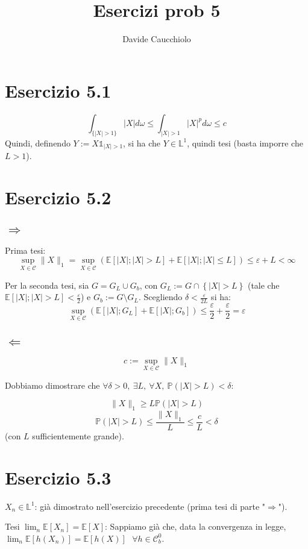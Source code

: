 \documentclass{article}
\title{Esercizi prob 5}
\author{Davide Caucchiolo}
\begin{document}
\section{Esercizio 5.1}
\[\int_{\{|X|>1\}}\left|X\right| d\omega \leq \int_{|X|>1} \left|X\right|^p d\omega \leq c\]
Quindi, definendo $Y:=X \mathds{1}_{|X|>1}$, si ha che $Y\in \mathbb{L}^1$, quindi tesi (basta imporre che $L>1$).

\section{Esercizio 5.2}
\subsection{$\Rightarrow $}
Prima tesi:
\[
	\sup_{X\in \mathcal{C}} \|X\|_1 
	= \sup_{X\in \mathcal{C}} \left(\mathbb{E}\left[\left|X\right|; \left|X\right| > L\right] + \mathbb{E}\left[\left|X\right|; \left|X\right| \leq  L\right]\right) 
	\leq  \varepsilon +L < \infty     
\]    

Per la seconda tesi, sia $G = G_L \cup G_b$, con $G_L:= G\cap \left\{|X|>L\right\}$ (tale che $\mathbb{E}\left[\left|X\right|; \left|X\right| > L\right] < \frac{\varepsilon }{2}$) e $G_b := G \setminus G_L$. Scegliendo $\delta <\frac{\varepsilon }{2L}$ si ha:
\[
	\sup_{X\in \mathcal{C}} \left(\mathbb{E}\left[|X|;G_L\right] + \mathbb{E}\left[|X|;G_b\right]\right) \leq  
	\frac{\varepsilon }{2} + \frac{\varepsilon }{2} = \varepsilon 
\]

\subsection{$\Leftarrow $}
\[c:= \sup_{X\in \mathcal{C}} \|X\|_1\]

Dobbiamo dimostrare che $\forall \delta >0,\ \exists L,\ \forall X,\ \mathbb{P}\left(|X|>L\right)<\delta $:

\[\|X\|_1 \geq  L\mathbb{P}\left(|X|>L\right)\]
\[\mathbb{P}\left(|X|>L\right) \leq  \frac{\|X\|_1}{L} \leq  \frac{c}{L} < \delta \]
(con $L$ sufficientemente grande).


\section{Esercizio 5.3}
$X_n\in \mathbb{L}^1$: già dimostrato nell'esercizio precedente (prima tesi di parte "$\Rightarrow $").

Tesi $\lim_n\mathbb{E}\left[X_n\right] = \mathbb{E}\left[X\right]$:
Sappiamo già che, data la convergenza in legge, $\lim_n\mathbb{E}\left[h(X_n)\right] = \mathbb{E}\left[h\left(X\right)\right]\ \ \ \forall h\in \mathcal{C}^0_b$.
\end{document}
